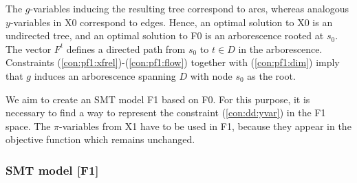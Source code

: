 The $g$-variables inducing the resulting tree correspond to arcs, whereas analogous $y$-variables in X0 correspond to edges.
Hence, an optimal solution to X0 is an undirected tree, and an optimal solution to F0 is an arborescence rooted at $s_0$.
The vector $F^t$ defines a directed path from $s_0$ to $t\in D$ in the arborescence.
Constraints (\ref{con:pf1:xfrel})-(\ref{con:pf1:flow}) together with (\ref{con:pf1:dim}) imply that $g$ induces an arborescence spanning $D$ with node $s_0$ as the root.

We aim to create an SMT model F1 based on F0.
For this purpose, it is necessary to find a way to represent the constraint (\ref{con:dd:yvar}) in the F1 space.
The $\pi$-variables from X1 have to be used in F1, because they appear in the objective function which remains unchanged.
%

%

\subsubsection{SMT model [F1]}

